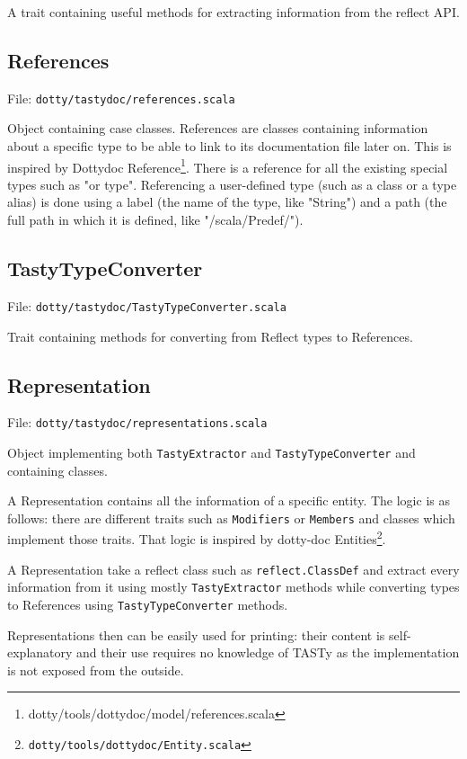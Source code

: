 \documentclass{report}
\begin{document}
A trait containing useful methods for extracting information from the reflect API.

\subsection{References}
File: \texttt{dotty/tastydoc/references.scala}

Object containing case classes. References are classes containing information about a specific type to be able to link to its documentation file later on. This is inspired by Dottydoc Reference\footnote{dotty/tools/dottydoc/model/references.scala}. There is a reference for all the existing special types such as "or type". Referencing a user-defined type (such as a class or a type alias) is done using a label (the name of the type, like "String") and a path (the full path in which it is defined, like "/scala/Predef/").

\subsection{TastyTypeConverter}
File: \texttt{dotty/tastydoc/TastyTypeConverter.scala}

Trait containing methods for converting from Reflect types to References.

\subsection{Representation}
\label{sec:representation}
File: \texttt{dotty/tastydoc/representations.scala}

Object implementing both \texttt{TastyExtractor} and \texttt{TastyTypeConverter} and containing classes.

A Representation contains all the information of a specific entity. The logic is as follows: there are different traits such as \texttt{Modifiers} or \texttt{Members} and classes which implement those traits. That logic is inspired by dotty-doc Entities\footnote{\texttt{dotty/tools/dottydoc/Entity.scala}}.

A Representation take a reflect class such as \texttt{reflect.ClassDef} and extract every information from it using mostly \texttt{TastyExtractor} methods while converting types to References using \texttt{TastyTypeConverter} methods.

Representations then can be easily used for printing: their content is self-explanatory and their use requires no knowledge of TASTy as the implementation is not exposed from the outside.
\end{document}
